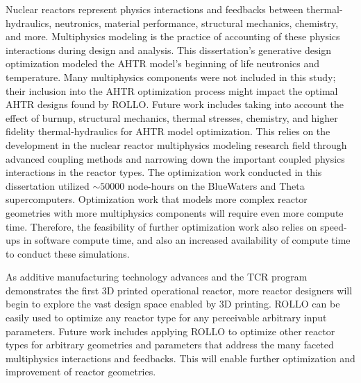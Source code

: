 Nuclear reactors represent physics interactions and feedbacks between thermal-hydraulics, 
neutronics, material performance, structural mechanics, chemistry, and more. 
Multiphysics modeling is the practice of accounting of these physics interactions 
during design and analysis. 
This dissertation's generative design optimization modeled the \gls{AHTR} model's 
beginning of life neutronics and temperature. 
Many multiphysics components were not included in this study; their inclusion into 
the \gls{AHTR} optimization process might impact the optimal \gls{AHTR} designs 
found by \gls{ROLLO}. 
Future work includes taking into account the effect of burnup, structural mechanics, 
thermal stresses, chemistry, and higher fidelity thermal-hydraulics for \gls{AHTR} 
model optimization. 
This relies on the development in the nuclear reactor multiphysics modeling research 
field through advanced coupling methods and narrowing down the important coupled 
physics interactions in the reactor types. 
The optimization work conducted in this dissertation utilized $\sim 50000$ node-hours 
on the BlueWaters and Theta supercomputers. 
Optimization work that models more complex reactor geometries with more 
multiphysics components will require even more compute time. 
Therefore, the feasibility of further optimization work also relies on speed-ups 
in software compute time, and also an increased availability of compute time to 
conduct these simulations. 

As additive manufacturing technology advances and the \gls{TCR} program 
demonstrates the first 3D printed operational reactor, more reactor designers 
will begin to explore the vast design space enabled by 3D printing. 
\gls{ROLLO} can be easily used to optimize any reactor type for any perceivable 
arbitrary input parameters. 
Future work includes applying \gls{ROLLO} to optimize other reactor types for arbitrary
geometries and parameters that address the many faceted multiphysics interactions 
and feedbacks. 
This will enable further optimization and improvement of reactor geometries.